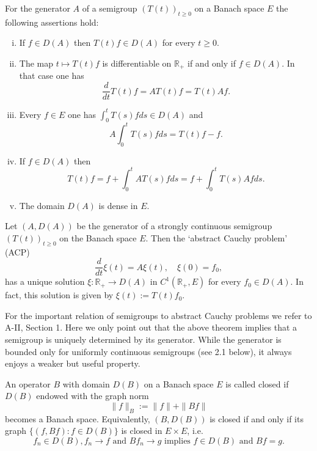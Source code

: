 \begin{proposition}
For the generator $A$ of a semigroup $(T(t))_{t \geq 0}$ on a Banach space $E$ the following assertions hold:

\begin{enumerate}[(i)]
\item
If $f \in D(A)$ then $T(t)f \in D(A)$ for every $t \geq 0$.

\item
The map $t \mapsto T(t)f$ is differentiable on $\mathbb{R}_{+}$ if and only if $f \in D(A)$.
In that case one has
\begin{equation}
\frac{d}{dt}T(t)f = AT(t)f = T(t)Af.
\end{equation}
\item
Every $f \in E$ one has $\int_0^{t} T(s)f ds \in D(A)$ and
\begin{equation}
A\int_0^{t} T(s)f ds = T(t)f - f.
\end{equation}
\item
If $f \in D(A)$ then
\[
T(t)f = f + \int_0^{t} AT(s)f ds = f + \int_0^{t} T(s)Af ds.
\]
\item
The domain $D(A)$ is dense in $E$.

\end{enumerate}
\end{proposition}
\begin{theorem}
Let $(A,D(A))$ be the generator of a strongly continuous semigroup $(T(t))_{t \geq 0}$ on the Banach space $E$.
Then the \enquote*{abstract Cauchy problem} (ACP)
\[
\frac{d}{dt}\xi(t) = A\xi(t), \quad \xi(0) = f_0,
\]
has a unique solution $\xi \colon \mathbb{R}_{+} \to D(A)$ in $C^{1}(\mathbb{R}_{+},E)$ for every $f_0 \in D(A)$.
In fact, this solution is given by $\xi(t) := T(t)f_0$.
\end{theorem}
For the important relation of semigroups to abstract Cauchy problems we refer to A-II, Section 1.
Here we only point out that the above theorem implies that a semigroup is uniquely determined by its generator.
While the generator is bounded only for uniformly continuous semigroups (see 2.1 below), it always enjoys a weaker but useful property.
\begin{definition}
An operator $B$ with domain $D(B)$ on a Banach space $E$ is called closed if $D(B)$ endowed with the graph norm
\[
\|f\|_{B} := \|f\| + \|Bf\|
\]
becomes a Banach space.
Equivalently, $(B,D(B))$ is closed if and only if its graph $\{(f,Bf) \colon f \in D(B)\}$ is closed in $E \times E$, i.e.
\begin{equation}
f_{n} \in D(B), f_{n} \to f \text{ and } Bf_{n} \to g \text{ implies } f \in D(B) \text{ and } Bf = g.
\end{equation}
\end{definition}
